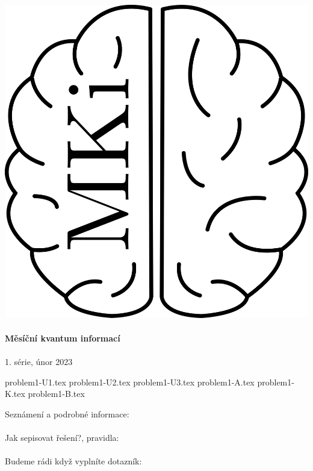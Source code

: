 \documentclass[12pt]{article}
\begin{document}
\thispagestyle{firststyle}
\vspace*{\fill}
\begin{center}
\includegraphics[scale=1]{../../../../propagace/logo/mkilogo.png}\\
\quad\\
\textbf{\Huge{Měsíční kvantum informací}}\\
\quad\\
\LARGE{1. série, únor 2023}
\end{center}
\vspace*{\fill}

\newpage
{problem1-U1.tex}
\newpage
{problem1-U2.tex}
{problem1-U3.tex}
{problem1-A.tex}
{problem1-K.tex}
{problem1-B.tex}
\newpage

Seznámení a podrobné informace:\\
\\

Jak sepisovat řešení?, pravidla:\\
\\

Budeme rádi když vyplníte dotazník:\\
\\

\vspace*{\fill}
\end{document}
